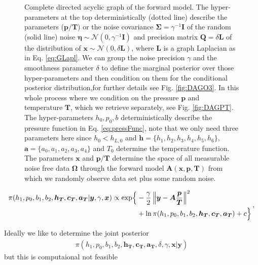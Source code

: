 \begin{figure}[thb!]
\caption[Complete directed acyclic graph of the forward model.]{Complete directed acyclic graph of the forward model. The hyper-parameters at the top deterministically (dotted line) describe the parameters ($\bm{p}/\bm{T}$) or the noise covariance $\bm{\Sigma} = \gamma^{-1} \bm{I}$ of the random (solid line) noise $\bm{\eta} \sim \mathcal{N}(0,\gamma^{-1} \bm{I} ) $ and precision matrix $\bm{Q} = \delta \bm{L}$ of the distribution of $\bm{x}\sim \mathcal{N}(0,\delta \bm{L}) $, where $\bm{L}$ is a graph Laplacian as in Eq. \ref{eq:GLapl}. We can group the noise precision $\gamma$  and the smoothness parameter $\delta$ to define the marginal posterior over those hyper-parameters and then condition on them for the conditional posterior distribution,for further details see Fig. \ref{fig:DAGO3}. In this whole process where we condition on the pressure $\bm{p}$ and temperature $\bm{T}$, which we retrieve separately, see Fig. \ref{fig:DAGPT}. The hyper-parameters $h_0,p_0,b$ deterministically describe the pressure function in Eq. \ref{eq:pressFunc}, note that we only need three parameters here since $h_0< h_{L,0}$ and $\bm{h}= \{ h_1, h_2,h_3,h_4,h_5,h_6\}$, $\bm{a} = \{ a_0, a_1, a_2,a_3,a_4\}$ and $T_0$ determine the temperature function.
The parameters $\bm{x}$ and $\bm{p}/ \bm{T}$ determine the space of all measurable noise free data $\bm{\Omega}$ through the forward model $\bm{A}(\bm{x},\bm{p},\bm{T})$ from which we randomly observe data set plus some random noise.}
\label{fig:DAGComplete}
\end{figure}


\begin{align}
	\begin{split}
		\pi(h_1,p_0,b_1,b_2,\bm{h_T},\bm{c_T},\bm{a_T} | \bm{y}, \gamma, \bm{x}) \propto  \exp\Bigl\{ & -\frac{\gamma}{2} \left\Vert \bm{y}- \bm{A} \frac{\bm{p}}{\bm{T}}  \right\Vert^2 \\ &+ \ln{\pi(h_1,p_0,b_1,b_2,\bm{h_T},\bm{c_T},\bm{a_T}) + c \Bigr\}  }
	\end{split} \, ,
\end{align}


Ideally we like to determine the joint posterior
\begin{align}
	\pi(h_1,p_0,b_1,b_2,\bm{h_T},\bm{c_T},\bm{a_T},\delta, \gamma, \bm{x}| \bm{y}) 
\end{align}
but this is computaional not feasible

